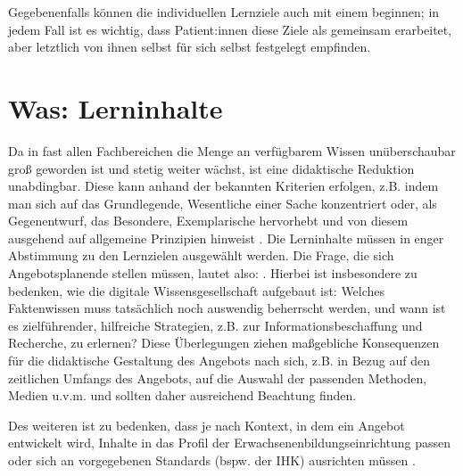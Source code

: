\documentclass[
  twoside,
  parskip=half-,
]{scrreprt}
\begin{document}
Gegebenenfalls können die individuellen Lernziele auch mit einem  beginnen; in jedem Fall ist es wichtig, dass Patient:innen diese Ziele als gemeinsam erarbeitet, aber letztlich von ihnen selbst für sich selbst festgelegt empfinden.


\section{Was: Lerninhalte}\label{sec:was}

Da in fast allen Fachbereichen die Menge an verfügbarem Wissen unüberschaubar groß geworden ist und
stetig weiter wächst, ist eine didaktische Reduktion unabdingbar. Diese kann anhand der bekannten
Kriterien erfolgen, z.B. indem man sich auf das Grundlegende, Wesentliche einer Sache konzentriert
oder, als Gegenentwurf, das Besondere, Exemplarische hervorhebt und von diesem ausgehend auf
allgemeine Prinzipien hinweist \autocite[vgl.][23f.]{kos}. Die Lerninhalte müssen in enger
Abstimmung zu den Lernzielen ausgewählt werden. Die Frage, die sich Angebotsplanende stellen müssen,
lautet also: . Hierbei ist insbesondere zu bedenken, wie die digitale Wissensgesellschaft aufgebaut ist: Welches Faktenwissen muss tatsächlich noch auswendig beherrscht werden, und wann ist es zielführender, hilfreiche Strategien, z.B. zur Informationsbeschaffung und Recherche, zu erlernen? Diese Überlegungen ziehen maßgebliche Konsequenzen für die didaktische Gestaltung des Angebots nach sich, z.B. in Bezug auf den zeitlichen Umfangs des Angebots, auf die Auswahl der passenden Methoden, Medien u.v.m. und sollten daher ausreichend Beachtung finden.

Des weiteren ist zu bedenken, dass je nach Kontext, in dem ein Angebot entwickelt wird, Inhalte in das Profil der Erwachsenenbildungseinrichtung passen oder sich an vorgegebenen Standards (bspw. der IHK) ausrichten müssen \autocite[vgl.][1008]{reich-claassen}.
\end{document}
